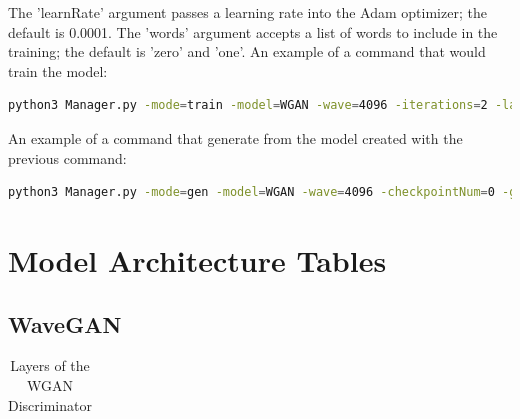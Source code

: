 \documentclass[a4paper, titlepage]{article}
\begin{document}
\begin{appendices}
  \newline
  \newline
  The 'learnRate' argument passes a learning rate into the Adam optimizer; the default is 0.0001.
  \newline
  \newline
  The 'words' argument accepts a list of words to include in the training; the default is 'zero' and 'one'.
  \newline
  \newline
  An example of a command that would train the model:
  \newline
  \begin{lstlisting}[language=bash]
  python3 Manager.py -mode=train -model=WGAN -wave=4096 -iterations=2 -lamb=10 -D_updates=1 -G_updates=1 -runName=TestA -batch=64 -learnRate=0.0001 -words zero one
\end{lstlisting}
  An example of a command that generate from the model created with the previous command:
  \newline
  \begin{lstlisting}[language=bash]
  python3 Manager.py -mode=gen -model=WGAN -wave=4096 -checkpointNum=0 -genLength=100 -runName=TestA
\end{lstlisting}

  \newpage

  \section{Model Architecture Tables}

  \subsection{WaveGAN}

  \begin{table}[ht]
    
    \caption{Layers of the WGAN Discriminator}
    \label{tab:WGAN_Dis}
    
    \begin{center}
      \begin{tabular}{ l | l | l}
        

\end{tabular}
\end{center}
\end{table}
\end{appendices}
\end{document}

